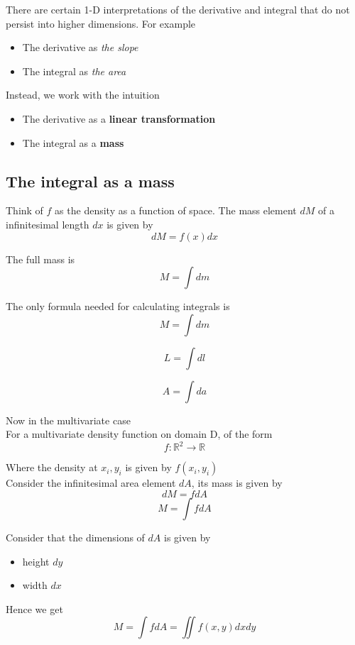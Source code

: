 There are certain 1-D interpretations of the derivative and integral that do not persist into higher dimensions. For example
\begin{itemize}
   \item The derivative as \textit{the slope}
   \item The integral as \textit{the area}
\end{itemize}

Instead, we work with the intuition 
\begin{itemize}
   \item The derivative as a \textbf{linear transformation}
   \item The integral as a \textbf{mass} \\
\end{itemize}

\subsection{The integral as a mass}
Think of $f$ as the density as a function of space. The mass element $dM$ of a infinitesimal length $dx$ is given by
\[
  dM = f(x) dx
\] 

The full mass is 
\[
  M = \int dm
\] 

\begin{framed}
   The only formula needed for calculating integrals is 
   \[
     M = \int dm
   \] 

   \[
     L = \int dl
   \] 

   \[
     A = \int da
   \] 
\end{framed}

Now in the multivariate case \\

For a multivariate density function on domain D, of the form
\[
  f: \mathbb{R}^2 \rightarrow \mathbb{R}
\] 

Where the density at $x_i, y_i$ is given by $ f(x_i, y_i)$ \\

Consider the infinitesimal area element $dA$, its mass is given by
 \[
  dM = f dA
\] 
\[
  M = \int f dA
\] 

Consider that the dimensions of $dA $ is given by
\begin{itemize}
   \item height $dy$ 
   \item width $dx$
\end{itemize}

Hence we get
\[
  M = \int f dA = \iint f(x,y) dx dy
\] 


